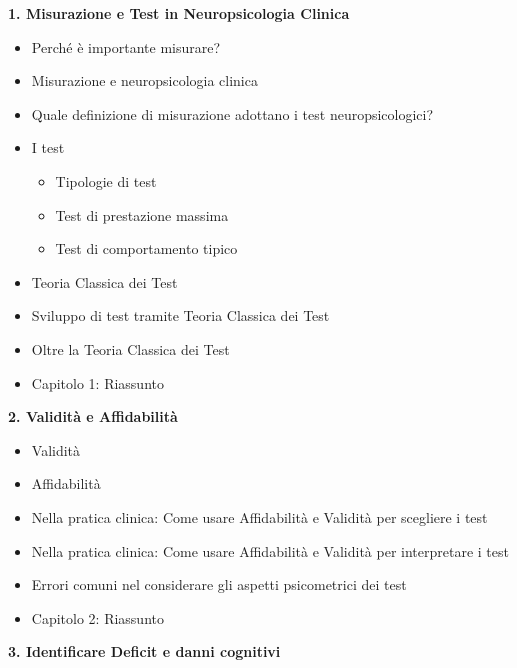 \documentclass[
  italian,
  letterpaper,
  paper=A4,
  headinclude=on,
  footinclude=on,
  12pt]{scrbook}
\providecommand{\tightlist}{%
  \setlength{\itemsep}{0pt}\setlength{\parskip}{0pt}}
\begin{document}
\textbf{1. Misurazione e Test in Neuropsicologia Clinica}

\begin{itemize}
\tightlist
\item
  Perché è importante misurare?
\item
  Misurazione e neuropsicologia clinica
\item
  Quale definizione di misurazione adottano i test neuropsicologici?
\item
  I test

  \begin{itemize}
  \tightlist
  \item
    Tipologie di test
  \item
    Test di prestazione massima
  \item
    Test di comportamento tipico
  \end{itemize}
\item
  Teoria Classica dei Test
\item
  Sviluppo di test tramite Teoria Classica dei Test
\item
  Oltre la Teoria Classica dei Test
\item
  Capitolo 1: Riassunto
\end{itemize}

\textbf{2. Validità e Affidabilità}

\begin{itemize}
\tightlist
\item
  Validità
\item
  Affidabilità
\item
  Nella pratica clinica: Come usare Affidabilità e Validità per
  scegliere i test
\item
  Nella pratica clinica: Come usare Affidabilità e Validità per
  interpretare i test
\item
  Errori comuni nel considerare gli aspetti psicometrici dei test
\item
  Capitolo 2: Riassunto
\end{itemize}

\textbf{3. Identificare Deficit e danni cognitivi}
\end{document}
